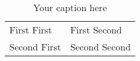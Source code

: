 \begin{sidewaystable}
    \centering
    \caption{Your caption here}
   \begin{tabular}{ll}
    First First & First Second\\
    Second First & Second Second
    \end{tabular}
\end{sidewaystable}
